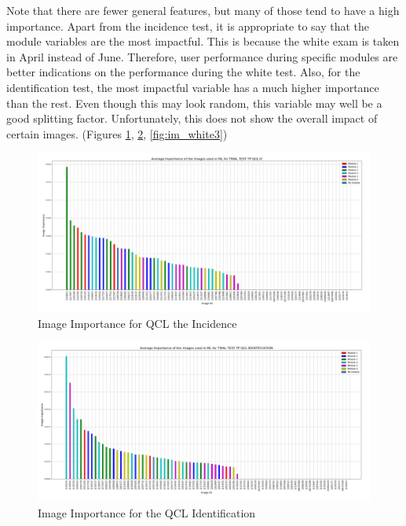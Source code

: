 \documentclass[a4paper,11pt]{report}
\numberwithin{figure}{section} %
\begin{document}
    Note that there are fewer general features, but many of those tend to have a high importance.
    Apart from the incidence test, it is appropriate to say that the module variables are the most impactful.
    This is because the white exam is taken in April instead of June.
    Therefore, user performance during specific modules are better indications on the performance during the white test.
    Also, for the  identification test, the most impactful variable has a much higher importance than the rest.
    Even though this may look random, this variable may well be a good splitting factor.
    Unfortunately, this does not show the overall impact of certain images. (Figures \ref{fig:im_white1}, \ref{fig:im_white2}, \ref{fig:im_white3})

      \begin{figure}[H]
      \centering
      \includegraphics[width=.95\linewidth]{plots/im_importance_TRIAL_TEST_TP_QCL_IC_2018-04-29_14_31_20.png}
      \caption{Image Importance for QCL the Incidence}
      \label{fig:im_white1}
      \end{figure}

      \begin{figure}[H]
      \centering
      \includegraphics[width=.95\linewidth]{plots/im_importance_TRIAL_TEST_TP_QCL_IDENTIFICATION_2018-04-29_14_28_06.png}
      \caption{Image Importance for the QCL Identification}
      \label{fig:im_white2}
      \end{figure}
\end{document}
